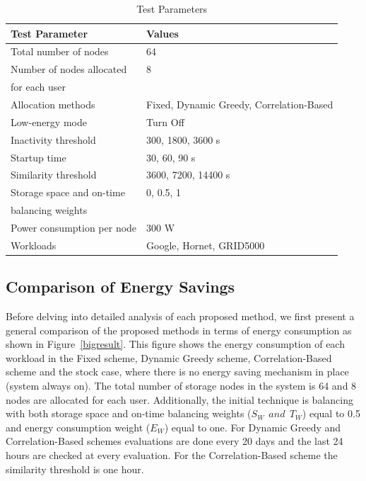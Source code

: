 \documentclass[preprint,12pt]{elsarticle}
\begin{document}
\begin{table}[!htbp]
 \begin{center}
  \begin{tabular}{|l|l|} \hline
Test Parameter & Values \\ \hline
Total number of nodes          & 64 \\ \hline
Number of nodes allocated        & 8 \\
for each user              & \\ \hline
Allocation methods           & Fixed, Dynamic Greedy, Correlation-Based \\ \hline
Low-energy mode             & Turn Off \\ \hline
Inactivity threshold          & 300, 1800, 3600 s \\ \hline
Startup time              & 30, 60, 90 s \\ \hline
Similarity threshold          & 3600, 7200, 14400 s \\ \hline
Storage space and on-time        & 0, 0.5, 1 \\
balancing weights            & \\ \hline
Power consumption per node       & 300 W \\ \hline
Workloads                        & Google, Hornet, GRID5000 \\ \hline
  \end{tabular}
 \end{center}
 \caption{Test Parameters}
 \label{tbl:params}
\end{table}

\subsection{Comparison of Energy Savings}
Before delving into detailed analysis of each proposed method, we first present a general comparison
of the proposed methods in terms of energy consumption as shown in Figure~\ref{bigresult}. This figure
shows the energy consumption of each workload in the Fixed scheme, Dynamic Greedy scheme, Correlation-Based
scheme and the stock case, where there is no energy saving mechanism in place (system always on). The total
number of storage nodes in the system is 64 and 8 nodes are allocated for each user. Additionally, the initial
technique is balancing with both storage space and on-time balancing weights ($S_W\ \ and\ \ T_W$) equal to 0.5
and energy consumption weight ($E_W$)
equal to one. For Dynamic Greedy and Correlation-Based schemes evaluations are done every 20 days and
the last 24 hours are checked at every evaluation. For the Correlation-Based scheme the similarity threshold 
is one hour.
\end{document}
